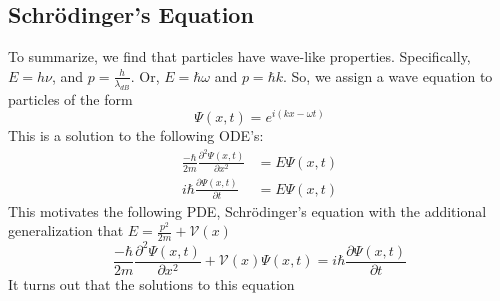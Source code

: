 \documentclass[11pt]{article}
\theoremstyle{definition}
\newcommand{\pder}[2]{\frac{\partial{#1}}{\partial{#2}}}
\newcommand{\pdder}[2]{\frac{\partial^2{#1}}{\partial{#2^2}}}
\begin{document}
\subsection{Schr\"odinger's Equation}
To summarize, we find that particles have wave-like properties.
Specifically, $E=h\nu$, and $p = \frac{h}{\lambda_{dB}}$. Or, $E = \hbar
\omega$ and $p = \hbar k$.
So, we assign a wave equation to particles of the form
$$ \Psi(x,t) = e^{i(kx-\omega t)} $$
This is a solution to the following ODE's:
\begin{align*}
    \frac{-\hbar}{2m} \pdder{\Psi(x,t)}{x} &= E\Psi(x,t)
    \tag{ODE 1}\\
    i\hbar\pder{\Psi(x,t)}{t} &= E\Psi(x,t)
    \tag{ODE 2}
\end{align*}
This motivates the following PDE, Schr\"odinger's equation with the
additional generalization that $E = \frac{p^2}{2m} + \mathcal{V}(x)$
\begin{equation}
    \frac{-\hbar}{2m} \pdder{\Psi(x,t)}{x}
    + \mathcal{V}(x)\Psi(x,t)
    = i\hbar\pder{\Psi(x,t)}{t}
    \tag{Schr\"odinger's equation}
\end{equation}
It turns out that the solutions to this equation 
\section{}
\end{document}
